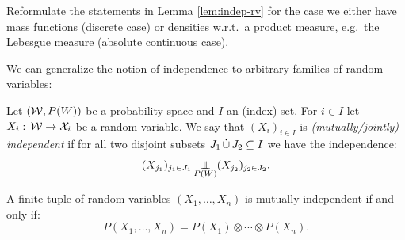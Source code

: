 \begin{Exc}
    Reformulate the statements in Lemma \ref{lem:indep-rv} for the case we either have mass functions (discrete case) 
    or densities w.r.t.\ a product measure, e.g.\ the Lebesgue measure (absolute continuous case).
\end{Exc}


We can generalize the notion of independence to arbitrary families of random variables:

\begin{Def}
    Let $(\mathcal{W},P(W))$ be a probability space and $I$ an (index) set. For $i \in I$ let $X_i:\, \mathcal{W} \to \mathcal{X}_i$ be 
    a random variable. We say that $(X_i)_{i \in I}$ is \emph{(mutually/jointly) independent}  if
    for all two disjoint subsets $J_1 \,\dot{\cup}\, J_2 \subseteq I$ we have the independence:
    \[ (X_{j_1})_{j_1 \in J_1} \operatorname*{\perp\mkern-11mu\perp}_{P(W)} (X_{j_2})_{j_2 \in J_2}.\]
\end{Def}

\begin{Exc}
    A finite tuple of random variables $(X_1,\dots,X_n)$ is mutually independent if and only if:
    \[ P(X_1,\dots,X_n) = P(X_1) \otimes \cdots \otimes P(X_n).\]
\end{Exc}

